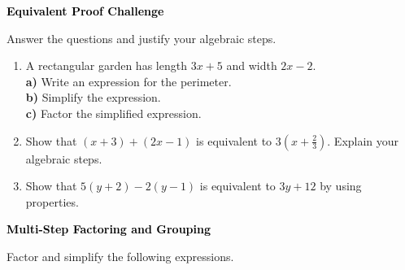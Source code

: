 \documentclass[12pt, letterpaper, fleqn]{article}
\newcommand{\blanklong}{\underline{\hspace{6.5cm}}}
\begin{document}
\newpage

\begin{tcolorbox}[colback=black!10]
\large\textcolor{black}{\textbf{Equivalent Proof Challenge}}
\end{tcolorbox}

\noindent
Answer the questions and justify your algebraic steps.

\vspace{3mm}

\begin{enumerate}[itemsep=2.2cm, leftmargin=0.6cm]

\item A rectangular garden has length $3x + 5$ and width $2x - 2$. \\
\textbf{a)} Write an expression for the perimeter. \blanklong \\
\textbf{b)} Simplify the expression. \blanklong \\
\textbf{c)} Factor the simplified expression. \blanklong

\vspace{2cm}

\item Show that $(x+3) + (2x-1)$ is equivalent to $3(x + \frac{2}{3})$. Explain your algebraic steps.

\vspace{2cm}

\item Show that $5(y + 2) - 2(y - 1)$ is equivalent to $3y + 12$ by using properties.

\vspace{2cm}

\end{enumerate}

\newpage

\begin{tcolorbox}[colback=black!10]
\large\textcolor{black}{\textbf{Multi-Step Factoring and Grouping}}
\end{tcolorbox}

\noindent
Factor and simplify the following expressions.

\vspace{3mm}
\end{document}
